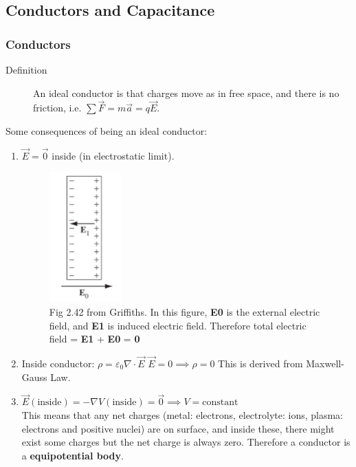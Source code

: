 \documentclass[12pt,a4paper,twoside]{article}
\numberwithin{equation}{section}
\begin{document}
\subsection{Conductors and Capacitance}
\subsubsection{Conductors}
    \begin{description}
        \item[Definition] An ideal conductor is that charges move as in free space, and there is no friction, i.e. $\sum \overrightarrow{F}=m\overrightarrow{a}=q\overrightarrow{E}$.
    \end{description}
    Some consequences of being an ideal conductor:
    \begin{enumerate}
        \item $\overrightarrow{E}=\overrightarrow{0}$ inside (in electrostatic limit).
        \begin{figure}[ht]
            \centering
            \includegraphics[height=5cm]{250-Revision/fig-2.42.png}
            \caption{Fig 2.42 from Griffiths. In this figure, \textbf{E0} is the external electric field, and \textbf{E1} is induced electric field. Therefore total electric field = \textbf{E1} + \textbf{E0} = \textbf{0}}
            \label{fig:2.42}
        \end{figure}
        \item Inside conductor:
            \subitem \(\rho=\varepsilon_0\nabla \cdot \overrightarrow{E}\)
            \subitem \(\overrightarrow{E}=0\implies\rho=0\)
            \subitem This is derived from Maxwell-Gauss Law.
        
        \item \(\overrightarrow{E}(\mathrm{inside})=-\nabla V(\mathrm{inside})=\overrightarrow{0}\implies V=\mathrm{constant}\)\\
        This means that any net charges (metal: electrons, electrolyte: ions, plasma: electrons and positive nuclei) are on surface, and inside these, there might exist some charges but the net charge is always zero. Therefore a conductor is a \textbf{equipotential body}.
        

\end{enumerate}
\end{document}
